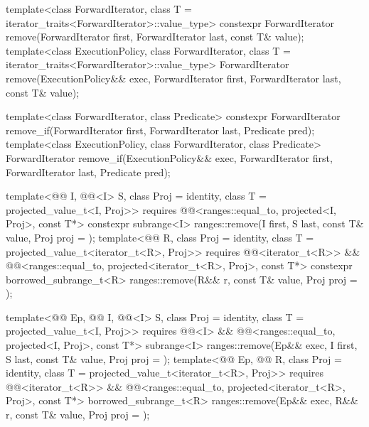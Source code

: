 %
%
\begin{itemdecl}
template<class ForwardIterator, class T = iterator_traits<ForwardIterator>::value_type>
  constexpr ForwardIterator remove(ForwardIterator first, ForwardIterator last,
                                   const T& value);
template<class ExecutionPolicy, class ForwardIterator,
         class T = iterator_traits<ForwardIterator>::value_type>
  ForwardIterator remove(ExecutionPolicy&& exec,
                         ForwardIterator first, ForwardIterator last,
                         const T& value);

template<class ForwardIterator, class Predicate>
  constexpr ForwardIterator remove_if(ForwardIterator first, ForwardIterator last,
                                      Predicate pred);
template<class ExecutionPolicy, class ForwardIterator, class Predicate>
  ForwardIterator remove_if(ExecutionPolicy&& exec,
                            ForwardIterator first, ForwardIterator last,
                            Predicate pred);

template<@@ I, @@<I> S, class Proj = identity,
         class T = projected_value_t<I, Proj>>
  requires @@<ranges::equal_to, projected<I, Proj>, const T*>
  constexpr subrange<I> ranges::remove(I first, S last, const T& value, Proj proj = {});
template<@@ R, class Proj = identity,
         class T = projected_value_t<iterator_t<R>, Proj>>
  requires @@<iterator_t<R>> &&
           @@<ranges::equal_to, projected<iterator_t<R>, Proj>, const T*>
  constexpr borrowed_subrange_t<R>
    ranges::remove(R&& r, const T& value, Proj proj = {});

template<@@ Ep, @@ I, @@<I> S,
         class Proj = identity, class T = projected_value_t<I, Proj>>
  requires @@<I> &&
           @@<ranges::equal_to, projected<I, Proj>, const T*>
  subrange<I>
    ranges::remove(Ep&& exec, I first, S last, const T& value, Proj proj = {});
template<@@ Ep, @@ R, class Proj = identity,
         class T = projected_value_t<iterator_t<R>, Proj>>
  requires @@<iterator_t<R>> &&
           @@<ranges::equal_to,
                                     projected<iterator_t<R>, Proj>, const T*>
  borrowed_subrange_t<R>
    ranges::remove(Ep&& exec, R&& r, const T& value, Proj proj = {});


\end{itemdecl}
